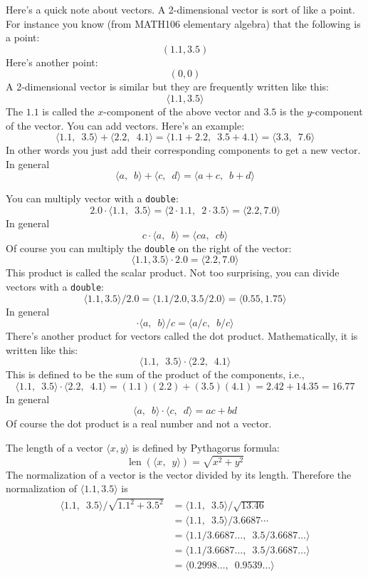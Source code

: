 Here's a quick note about vectors.
A 2-dimensional vector is sort of like a point.
For instance you know
(from MATH106 elementary algebra) that the following is a point:
\[
	(1.1, 3.5)
\]
Here's another point:
\[
	(0, 0)
\]
A 2-dimensional vector is similar but they are frequently written like this:
\[
	\langle 1.1, 3.5 \rangle
\]
The $1.1$ is called the $x$-component of the above vector and $3.5$ is
the $y$-component of the vector. You can add vectors. Here's an example:
\[
	\langle 1.1, \,\,\, 3.5 \rangle
        +
        \langle 2.2, \,\,\, 4.1 \rangle
        =
        \langle 1.1 + 2.2, \,\,\, 3.5 + 4.1 \rangle
        =
        \langle 3.3, \,\,\, 7.6 \rangle
\]
In other words you just add their corresponding components to get a new vector.
In general
\[
	\langle a, \,\,\, b \rangle
        +
        \langle c, \,\,\, d \rangle
        =
        \langle a + c, \,\,\, b + d \rangle
\]

You can multiply vector with a \verb!double!:
\[
	2.0 \cdot  \langle 1.1, \,\,\, 3.5 \rangle =
        \langle 2 \cdot 1.1, \,\,\, 2 \cdot 3.5 \rangle
        =
        \langle 2.2, 7.0 \rangle
\]
In general
\[
	c \cdot \langle a, \,\,\, b \rangle
        =
        \langle ca, \,\,\, cb \rangle
\]
Of course you can multiply the \verb!double! on the right of the vector:
\[
	\langle 1.1, 3.5 \rangle  \cdot  2.0 = 
        \langle 2.2, 7.0 \rangle
\]
This product is called the scalar product.
Not too surprising, you can divide vectors with a \texttt{double}:
\[
	\langle 1.1, 3.5 \rangle / 2.0 =
        \langle 1.1 / 2.0, 3.5 / 2.0 \rangle =  \langle 0.55, 1.75 \rangle
\]
In general
\[
	\cdot \langle a, \,\,\, b \rangle / c
        =
        \langle a/c, \,\,\, b/c \rangle
\]
There's another product for vectors called the dot product.
Mathematically, it is written like this:
\[
	\langle 1.1, \,\,\, 3.5 \rangle \cdot \langle 2.2, \,\,\, 4.1 \rangle
\]
This is defined to be the sum of the product of the components, i.e.,
\[
	\langle 1.1, \,\,\, 3.5 \rangle \cdot
        \langle 2.2, \,\,\, 4.1 \rangle
        =
        (1.1)(2.2) + (3.5)(4.1)
        = 2.42 + 14.35 = 16.77
\]
In general
\[
	\langle a, \,\,\, b \rangle \cdot
        \langle c, \,\,\, d \rangle
        =
        ac + bd
\]
Of course the dot product is a real number and not a vector.

The length of a vector $\langle x, y \rangle$ is defined by Pythagorus formula:
\[
\operatorname{len}( \langle x, \,\,\, y \rangle ) = \sqrt{x^2 + y^2}
\]
The normalization of a vector is the vector divided by its length.
Therefore the normalization of
$\langle 1.1, 3.5 \rangle$ is
\begin{align*}
\langle 1.1, \,\,\, 3.5 \rangle / \sqrt{1.1^2 + 3.5^2}
&= \langle 1.1, \,\,\, 3.5 \rangle / \sqrt{13.46} \\
&= \langle 1.1, \,\,\, 3.5 \rangle / 3.6687\cdots \\
&= \langle 1.1/3.6687\ldots, \,\,\, 3.5/3.6687\ldots \rangle \\
&= \langle 1.1/3.6687\ldots, \,\,\, 3.5/3.6687\ldots \rangle \\
&= \langle 0.2998\ldots, \,\,\, 0.9539\ldots \rangle 
\end{align*}


